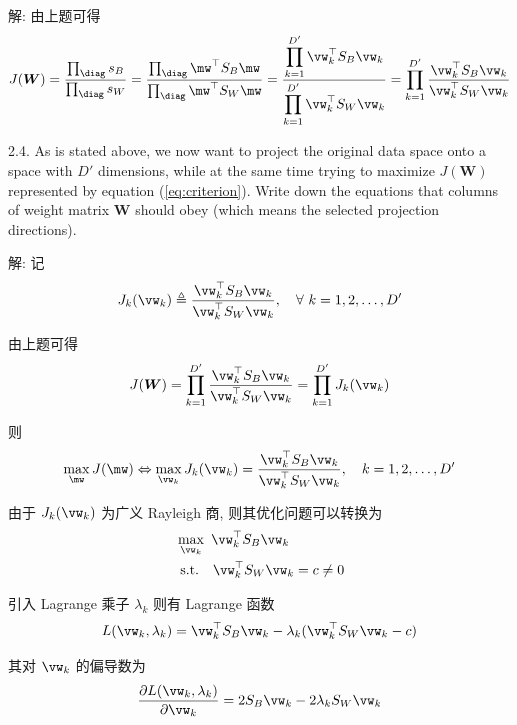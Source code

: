 \documentclass[openany]{ctexbook}
\theoremstyle{kaiti}
\theoremstyle{normal}
\begin{document}
解: 由上题可得
\begin{equation}
    J(\bm{W})
    =\frac{\prod_{\diag}s_{B}}{\prod_{\diag}s_{W}}
    =\frac{\prod_{\diag}\mw^{\top}S_B\mw}{\prod_{\diag}\mw^{\top}S_W\mw}
    =\frac{\displaystyle\prod_{k=1}^{D'}\vw_k^{\top}S_B\vw_k}{\displaystyle\prod_{k=1}^{D'}\vw_k^{\top}S_W\vw_k}
    =\prod_{k=1}^{D'}\frac{\vw_k^{\top}S_B\vw_k}{\vw_k^{\top}S_W\vw_k}
\end{equation}

2.4. As is stated above, we now want to project the original data space onto a space with $D'$ dimensions, while at the same time trying to maximize $J(\bm{W})$ represented by equation (\ref{eq:criterion}). Write down the equations that columns of weight matrix $\bm{W}$ should obey (which means the selected projection directions).

解: 记
\begin{equation}
  J_k(\vw_k)\triangleq\frac{\vw_k^{\top}S_B\vw_k}{\vw_k^{\top}S_W\vw_k},\quad\forall~k=1,2,\dots,D'
\end{equation}

由上题可得
\begin{equation}
  J(\bm{W})=\prod_{k=1}^{D'}\frac{\vw_k^{\top}S_B\vw_k}{\vw_k^{\top}S_W\vw_k}=\prod_{k=1}^{D'}J_k(\vw_k)
\end{equation}

则
\begin{equation}
  \max_{\mw} J(\mw)\Leftrightarrow\max_{\vw_k}J_k(\vw_k)=\frac{\vw_k^{\top}S_B\vw_k}{\vw_k^{\top}S_W\vw_k},\quad k=1,2,\dots,D'
\end{equation}

由于 $J_k(\vw_k)$ 为广义 Rayleigh 商, 则其优化问题可以转换为
\begin{equation}
  \begin{aligned}
    &\max_{\vw_k}~\vw_k^{\top}S_B\vw_k\\
    &~\mathrm{s.t.}~~~\vw_k^{\top}S_W\vw_k=c\neq0\\
  \end{aligned}
\end{equation}

引入 Lagrange 乘子 $\lambda_k$ 则有 Lagrange 函数
\begin{equation}
  L(\vw_k,\lambda_k)=\vw_k^{\top}S_B\vw_k-\lambda_k(\vw_k^{\top}S_W\vw_k-c)
\end{equation}

其对 $\vw_k$ 的偏导数为
\begin{equation}
  \frac{\partial L(\vw_k,\lambda_k)}{\partial\vw_k}=2S_B\vw_k-2\lambda_kS_W\vw_k
\end{equation}
\end{document}
